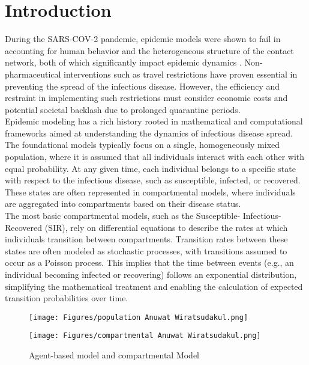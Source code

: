% 

\section{Introduction}

During the SARS-COV-2 pandemic, epidemic models were shown to fail in accounting for human behavior and the heterogeneous structure of the contact network, both of which significantly impact epidemic dynamics \cite{Lewis2021wrong}. Non-pharmaceutical interventions such as travel restrictions have proven essential in preventing the spread of the infectious disease\cite{bajardi2011human}. However, the efficiency and restraint in implementing such restrictions must consider economic costs and potential societal backlash due to prolonged quarantine periods\cite{fenichel2013economic}.\\ 

Epidemic modeling has a rich history rooted in mathematical and computational frameworks aimed at understanding the dynamics of infectious disease spread. The foundational models typically focus on a single, homogeneously mixed population, where it is assumed that all individuals interact with each other with equal probability. At any given time, each individual belongs to a specific state with respect to the infectious disease, such as susceptible, infected, or recovered. These states are often represented in compartmental models, where individuals are aggregated into compartments based on their disease status\cite{brauer2008compartmental}. \\

The most basic compartmental models, such as the Susceptible- Infectious- Recovered (SIR), rely on differential equations to describe the rates at which individuals transition between compartments. Transition rates between these states are often modeled as stochastic processes, with transitions assumed to occur as a Poisson process. This implies that the time between events (e.g., an individual becoming infected or recovering) follows an exponential distribution, simplifying the mathematical treatment and enabling the calculation of expected transition probabilities over time.\\

\begin{figure}[h]
    \centering
    \begin{minipage}{0.45\textwidth}
        \centering
        \texttt{[image: Figures/population Anuwat Wiratsudakul.png]}
    \end{minipage}
    \hfill
    \begin{minipage}{0.45\textwidth}
        \centering
        \texttt{[image: Figures/compartmental Anuwat Wiratsudakul.png]}
    \end{minipage}
    \caption{Agent-based model and compartmental Model \cite{wiratsudakul2018dynamics}}
\end{figure}

